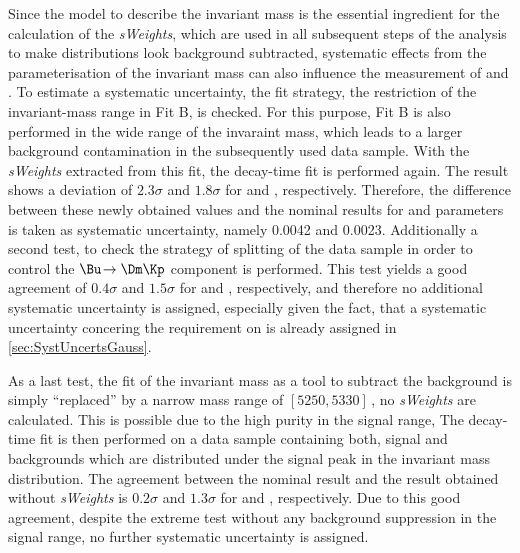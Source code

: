 Since the model to describe the invariant mass is the essential ingredient for the calculation of the \emph{sWeights}, which are used in all subsequent steps of the analysis to make distributions look background subtracted, systematic effects from the parameterisation of the invariant mass can also influence the measurement of \Sf and \Sfbar.
To estimate a systematic uncertainty, the fit strategy, \ie the restriction of the invariant-mass range in Fit B, is checked.
For this purpose, Fit B is also performed in the wide range of the invaraint mass, which leads to a larger background contamination in the subsequently used data sample.
With the \emph{sWeights} extracted from this fit, the decay-time fit is performed again.
The result shows a deviation of $2.3\sigma$ and $1.8\sigma$ for \Sf and \Sfbar, respectively.
Therefore, the difference between these newly obtained values and the nominal results for \Sf and \Sfbar parameters is taken as systematic uncertainty, namely \num{0.0042} and \num{0.0023}.
Additionally a second test, to check the strategy of splitting of the data sample in order to control the $\Bu\!\to\Dm\Kp$ component is performed.
This test yields a good agreement of $0.4\sigma$ and $1.5\sigma$ for \Sf and \Sfbar, respectively, and therefore no additional systematic uncertainty is assigned, especially given the fact, that a systematic uncertainty concering the requirement on \dllkpi is already assigned in \cref{sec:SystUncertsGauss}.

As a last test, the fit of the invariant mass as a tool to subtract the background is simply \enquote{replaced} by a narrow mass range of $[5250,5330]\,$\si{\MeVcc}, \ie no \emph{sWeights} are calculated.
This is possible due to the high purity in the signal range,
The decay-time fit is then performed on a data sample containing both, signal and backgrounds which are distributed under the signal peak in the invariant mass distribution.
The agreement between the nominal result and the result obtained without \emph{sWeights} is $0.2\sigma$ and $1.3\sigma$ for \Sf and \Sfbar, respectively.
Due to this good agreement, despite the extreme test without any background suppression in the signal range, no further systematic uncertainty is assigned.
